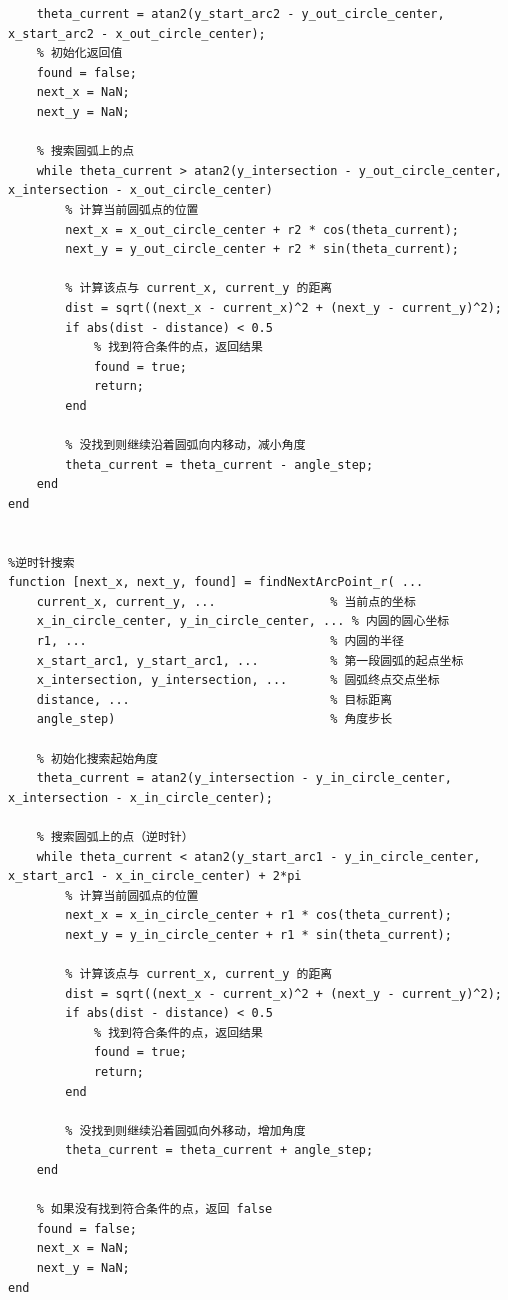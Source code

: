 \documentclass{cumcmthesis1}
\begin{document}
\begin{lstlisting}[caption={求解问题5的代码，将过程和结果打印到控制台上}, label={lst:tenth_code}]
    % 初始化搜索起始角度
    theta_current = atan2(y_start_arc2 - y_out_circle_center, x_start_arc2 - x_out_circle_center);
    % 初始化返回值
    found = false;
    next_x = NaN;
    next_y = NaN;

    % 搜索圆弧上的点
    while theta_current > atan2(y_intersection - y_out_circle_center, x_intersection - x_out_circle_center)
        % 计算当前圆弧点的位置
        next_x = x_out_circle_center + r2 * cos(theta_current);
        next_y = y_out_circle_center + r2 * sin(theta_current);
        
        % 计算该点与 current_x, current_y 的距离
        dist = sqrt((next_x - current_x)^2 + (next_y - current_y)^2);
        if abs(dist - distance) < 0.5
            % 找到符合条件的点，返回结果
            found = true;
            return;
        end
        
        % 没找到则继续沿着圆弧向内移动，减小角度
        theta_current = theta_current - angle_step;
    end
end


%逆时针搜索
function [next_x, next_y, found] = findNextArcPoint_r( ...
    current_x, current_y, ...                % 当前点的坐标
    x_in_circle_center, y_in_circle_center, ... % 内圆的圆心坐标
    r1, ...                                  % 内圆的半径
    x_start_arc1, y_start_arc1, ...          % 第一段圆弧的起点坐标
    x_intersection, y_intersection, ...      % 圆弧终点交点坐标
    distance, ...                            % 目标距离
    angle_step)                              % 角度步长

    % 初始化搜索起始角度
    theta_current = atan2(y_intersection - y_in_circle_center, x_intersection - x_in_circle_center);

    % 搜索圆弧上的点（逆时针）
    while theta_current < atan2(y_start_arc1 - y_in_circle_center, x_start_arc1 - x_in_circle_center) + 2*pi
        % 计算当前圆弧点的位置
        next_x = x_in_circle_center + r1 * cos(theta_current);
        next_y = y_in_circle_center + r1 * sin(theta_current);
        
        % 计算该点与 current_x, current_y 的距离
        dist = sqrt((next_x - current_x)^2 + (next_y - current_y)^2);
        if abs(dist - distance) < 0.5
            % 找到符合条件的点，返回结果
            found = true;
            return;
        end
        
        % 没找到则继续沿着圆弧向外移动，增加角度
        theta_current = theta_current + angle_step;
    end

    % 如果没有找到符合条件的点，返回 false
    found = false;
    next_x = NaN;
    next_y = NaN;
end



\end{lstlisting}
\end{document}
